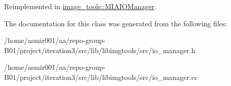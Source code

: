 Reimplemented in \hyperlink{classimage__tools_1_1MIAIOManager_a209180ddcfe3bf43d8fd7c6635391ea4}{image\+\_\+tools\+::\+M\+I\+A\+I\+O\+Manager}.



The documentation for this class was generated from the following files\+:\begin{DoxyCompactItemize}
\item 
/home/asmir001/aa/repo-\/group-\/\+B01/project/iteration3/src/lib/libimgtools/src/io\+\_\+manager.\+h\item 
/home/asmir001/aa/repo-\/group-\/\+B01/project/iteration3/src/lib/libimgtools/src/io\+\_\+manager.\+cc\end{DoxyCompactItemize}
